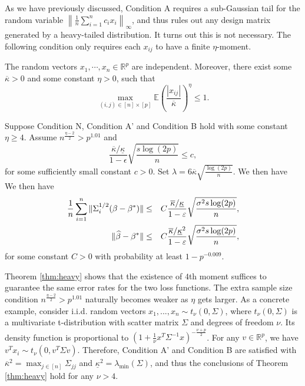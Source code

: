 As we have previously discussed, Condition A requires a sub-Gaussian tail for the random variable $\left\|\frac{1}{n}\sum_{i=1}^nc_ix_i\right\|_{\infty}$, and thus rules out any design matrix generated by a heavy-tailed distribution. It turns out this is not necessary. The following condition only requires each $x_{ij}$ to have a finite $\eta$-moment.

\begin{conda'}
The random vectors $x_1,\cdots,x_n\in\mathbb{R}^p$ are independent. Moreover, there exist some $\overline{\kappa}>0$ and some constant $\eta>0$, such that
$$\max_{(i,j)\in[n]\times [p]}\mathbb{E}\left(\frac{|x_{ij}|}{\overline{\kappa}}\right)^{\eta}\leq 1.$$
\end{conda'}

\begin{thm}\label{thm:heavy}
Suppose Condition N, Condition A' and Condition B hold with some constant $\eta\geq 4$. Assume $n^{\frac{\eta-2}{2}}>p^{1.01}$ and
$$\frac{\overline{\kappa}/\underline{\kappa}}{1-\epsilon}\sqrt{\frac{s\log(2p)}{n}}\leq c,$$
for some sufficiently small constant $c>0$. Set $\lambda=6\overline{\kappa}\sqrt{\frac{\log(2p)}{n}}$. We then have
We then have
\begin{eqnarray*}
\frac{1}{n}\sum_{i=1}^n\|\Sigma_i^{1/2}(\beta-\beta^*)\| &\leq& C\frac{\overline{\kappa}/\underline{\kappa}}{1-\epsilon}\sqrt{\frac{\sigma^2s\log(2p)}{n}}, \\
\|\wh{\beta}-\beta^*\| &\leq& C\frac{\overline{\kappa}/\underline{\kappa}^2}{1-\epsilon}\sqrt{\frac{\sigma^2s\log(2p)}{n}},
\end{eqnarray*}
for some constant $C>0$ with probability at least $1-p^{-0.009}$.
\end{thm}

Theorem \ref{thm:heavy} shows that the existence of $4$th moment suffices to guarantee the same error rates for the two loss functions. The extra sample size condition $n^{\frac{\eta-2}{2}}>p^{1.01}$ naturally becomes weaker as $\eta$ gets larger. As a concrete example, consider i.i.d. random vectors $x_1,...,x_n\sim t_{\nu}(0,\Sigma)$, where $t_{\nu}(0,\Sigma)$ is a multivariate t-distribution with scatter matrix $\Sigma$ and degrees of freedom $\nu$. Its density function is proportional to $\left(1+\frac{1}{\nu}x^T\Sigma^{-1}x\right)^{-\frac{\nu+p}{2}}$. For any $v\in\mathbb{R}^p$, we have $v^Tx_i\sim t_{\nu}(0,v^T\Sigma v)$. Therefore, Condition A' and Condition B are satisfied with $\overline{\kappa}^2=\max_{j\in[n]}\Sigma_{jj}$ and $\underline{\kappa}^2=\lambda_{\min}(\Sigma)$, and thus the conclusions of Theorem \ref{thm:heavy} hold for any $\nu>4$.
